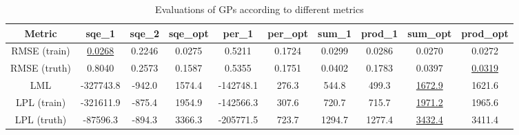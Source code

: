 \begin{table}
    \centering
    \begin{tabular}{|c|c|c|c|c|c|c|c|c|c|}
        \hline
        Metric & sqe\_1 & sqe\_2 & sqe\_opt & per\_1 & per\_opt & sum\_1 & prod\_1 & sum\_opt & prod\_opt \\
        \hline
        RMSE (train) & \underline{0.0268} & 0.2246 & 0.0275 & 0.5211 & 0.1724 & 0.0299 & 0.0286 & 0.0270 & 0.0272 \\
        RMSE (truth) & 0.8040 & 0.2573 & 0.1587 & 0.5355 & 0.1751 & 0.0402 & 0.1783 & 0.0397 & \underline{0.0319} \\
        LML & -327743.8 & -942.0 & 1574.4 & -142748.1 & 276.3 & 544.8 & 499.3 & \underline{1672.9} & 1621.6 \\
        LPL (train) & -321611.9 & -875.4 & 1954.9 & -142566.3 & 307.6 & 720.7 & 715.7 & \underline{1971.2} & 1965.6 \\
        LPL (truth) & -87596.3 & -894.3 & 3366.3 & -205771.5 & 723.7 & 1294.7 & 1277.4 & \underline{3432.4} & 3411.4 \\
        \hline
    \end{tabular}
    \caption{Evaluations of GPs according to different metrics}
    \label{table:metrics}
\end{table}

